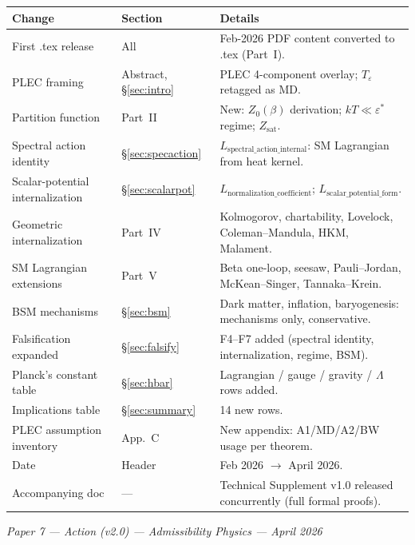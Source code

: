 \documentclass[11pt]{article}
\theoremstyle{definition}
\begin{document}
\begin{center}
\begin{tabular}{@{}lll@{}}
\toprule
\textbf{Change} & \textbf{Section} & \textbf{Details} \\ \midrule
First .tex release & All & Feb-2026 PDF content converted to .tex (Part~I). \\
PLEC framing & Abstract, \S\ref{sec:intro} & PLEC 4-component overlay; $T_\varepsilon$ retagged as MD. \\
Partition function & Part~II & New: $Z_0(\beta)$ derivation; $kT \ll \varepsilon^*$ regime; $Z_{\mathrm{sat}}$. \\
Spectral action identity & \S\ref{sec:specaction} & $L_{\mathrm{spectral\_action\_internal}}$: SM Lagrangian from heat kernel. \\
Scalar-potential internalization & \S\ref{sec:scalarpot} & $L_{\mathrm{normalization\_coefficient}}$; $L_{\mathrm{scalar\_potential\_form}}$. \\
Geometric internalization & Part~IV & Kolmogorov, chartability, Lovelock, Coleman--Mandula, HKM, Malament. \\
SM Lagrangian extensions & Part~V & Beta one-loop, seesaw, Pauli--Jordan, McKean--Singer, Tannaka--Krein. \\
BSM mechanisms & \S\ref{sec:bsm} & Dark matter, inflation, baryogenesis: mechanisms only, conservative. \\
Falsification expanded & \S\ref{sec:falsify} & F4--F7 added (spectral identity, internalization, regime, BSM). \\
Planck's constant table & \S\ref{sec:hbar} & Lagrangian / gauge / gravity / $\Lambda$ rows added. \\
Implications table & \S\ref{sec:summary} & 14 new rows. \\
PLEC assumption inventory & App.~C & New appendix: A1/MD/A2/BW usage per theorem. \\
Date & Header & Feb 2026 $\to$ April 2026. \\
Accompanying doc & --- & Technical Supplement v1.0 released concurrently (full formal proofs). \\
\bottomrule
\end{tabular}
\end{center}

\vspace{2em}
\begin{center}
\small\itshape Paper 7 — Action (v2.0) \quad --- \quad Admissibility Physics --- April 2026
\end{center}
\end{document}
